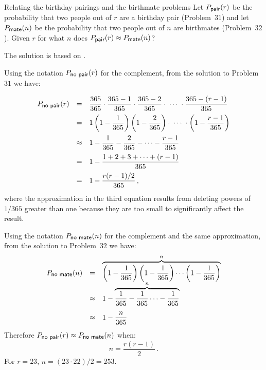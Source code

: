 
\begin{prob}{Relating the birthday pairings and the birthmate problems}
Let $P_{\textsf{\footnotesize pair}}(r)$ be the probability that two people out of $r$ are a birthday pair (Problem~$31$) and let $P_{\textsf{\footnotesize mate}}(n)$ be the probability that two people out of $n$ are birthmates (Problem~$32$). Given $r$ for what $n$ does $P_{\textsf{\footnotesize pair}}(r) \approx P_{\textsf{\footnotesize mate}}(n)$?
\end{prob}


The solution is based on \cite{birthday}.

Using the notation $P_{\textsf{\footnotesize no pair}}(r)$ for the complement, from the solution to Problem~$31$ we have:
\[
\renewcommand*{\arraystretch}{2.2}
\begin{array}{lcl}
P_{\textsf{\footnotesize no pair}}(r)&=&
\disfrac{365}{365}\cdot 
  \frac{365-1}{365}\cdot \frac{365-2}{365} \cdot\;
  \cdots \;\cdot \frac{365-(r-1)}{365}\\
&=&1\left(1-\disfrac{1}{365}\right)
  \left(1-\disfrac{2}{365}\right) \cdot\;
  \cdots \;\cdot \left(1-\disfrac{r-1}{365}\right)\\
&\approx&1-\disfrac{1}{365} - \disfrac{2}{365} -
  \cdots - \disfrac{r-1}{365}\\
&=&1-\disfrac{1+2+3+\cdots + (r-1)}{365}\\
&=&1-\disfrac{r(r-1)/2}{365}\,,
\end{array}
\]
where the approximation in the third equation results from deleting powers of $1/365$ greater than one because they are too small to significantly affect the result.

Using the notation $P_{\textsf{\footnotesize no mate}}(n)$ for the complement and the same approximation, from the solution to Problem~$32$ we have:
\[
\renewcommand*{\arraystretch}{2.2}
\begin{array}{lcl}
P_{\textsf{\footnotesize no mate}}(n)
&=&\overbrace{\left(1-\frac{1}{365}\right)
  \left(1-\frac{1}{365}\right)\cdots
  \left(1-\frac{1}{365}\right)}^{n}\\
&\approx& 1-\overbrace{\frac{1}{365}-\frac{1}{365}\cdots-
  \frac{1}{365}}^{n}\\
&\approx& 1-\disfrac{n}{365}\\
\end{array}
\]
Therefore $P_{\textsf{\footnotesize no pair}}(r)\approx P_{\textsf{\footnotesize no mate}}(n)$ when:
\[
n=\frac{r(r-1)}{2}\,.
\]
For $r=23$, $n=(23\cdot 22)/2=253$.

